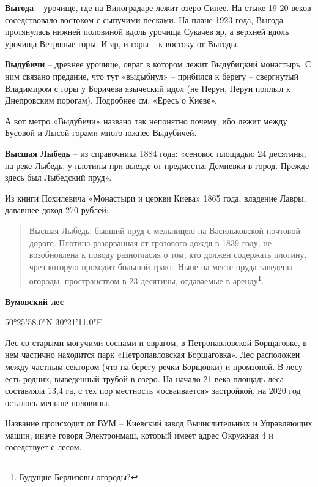 \medskip

\textbf{Выгода} – урочище, где на Виноградаре лежит озеро Синее. На стыке 19-20 веков соседствовало востоком с сыпучими песками. На плане 1923 года, Выгода протянулась нижней половиной вдоль урочища Сукачев яр, а верхней вдоль урочища Ветряные горы. И яр, и горы – к востоку от Выгоды.\\ 

\medskip

\textbf{Выдубичи} – древнее урочище, овраг в котором лежит Выдубицкий монастырь. С ним связано предание, что тут «выдыбнул» – прибился к берегу – свергнутый Владимиром с горы у Боричева языческий идол (не Перун, Перун поплыл к Днепровским порогам). Подробнее см. «Ересь о Киеве».

А вот метро «Выдубичи» названо так непонятно почему, ибо лежит между Бусовой и Лысой горами много южнее Выдубичей.\\

\medskip

\textbf{Высшая Лыбедь} – из справочника 1884 года: «сенокос площадью 24 десятины, на реке Лыбедь, у плотины при выезде от предместья Демиевки в город. Прежде здесь был Лыбедский пруд».

Из книги Похилевича «Монастыри и церкви Киева» 1865 года, владение Лавры, дававшее доход 270 рублей:

\begin{quotation}
\noindent Высшая-Лыбедь, бывший пруд с мельницею на Васильковской почтовой дороге. Плотина разорванная от грозового дождя в 1839 году, не возобновлена к поводу разногласия о том, кто должен содержать плотину, чрез которую проходит большой тракт. Ныне на месте пруда заведены огороды, пространством в 23 десятины, отдаваемые в аренду\footnote{Будущие Берлизовы огороды?}. 
\end{quotation}

\medskip

\textbf{Вумовский лес}

50°25'58.0"N 30°21'11.0"E

Лес со старыми могучими соснами и оврагом, в Петропавловской Борщаговке, в нем частично находится парк «Петропавловская Борщаговка». Лес расположен между частным сектором (что на берегу речки Борщовки) и промзоной. В лесу есть родник, выведенный трубой в озеро. На начало 21 века площадь леса составляла 13,4 га, с тех пор местность «осваивается» застройкой, на 2020 год осталось меньше половины.

Название происходит от ВУМ – Киевский завод Вычислительных и Управляющих машин, иначе говоря Электронмаш, который имеет адрес Окружная 4 и соседствует с лесом.\\


